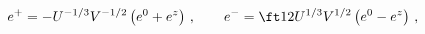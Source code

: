 \begin{equation}
  e^+= -U^{-1/3}V^{-1/2}\left( e^0+e^z\right)\,,\qquad
e^-=\ft12 U^{1/3}V^{1/2}\left( e^0-e^z\right)\,,
 \label{e+-tz}
\end{equation}

